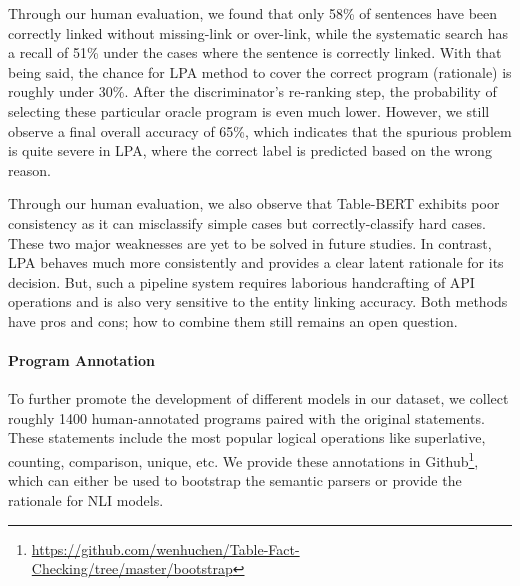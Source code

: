 \documentclass{article} \usepackage{iclr2020_conference,times}
\begin{document}
Through our human evaluation, we found that only 58\% of sentences have been correctly linked without missing-link or over-link, while the systematic search has a recall of 51\% under the cases where the sentence is correctly linked. With that being said, the chance for LPA method to cover the correct program (rationale) is roughly under 30\%. After the discriminator's re-ranking step, the probability of selecting these particular oracle program is even much lower. However, we still observe a final overall accuracy of 65\%, which indicates that the spurious problem is quite severe in LPA, where the correct label is predicted based on the wrong reason.  

Through our human evaluation, we also observe that Table-BERT exhibits poor consistency as it can misclassify simple cases but correctly-classify hard cases. These two major weaknesses are yet to be solved in future studies. In contrast, LPA behaves much more consistently and provides a clear latent rationale for its decision. But, such a pipeline system requires laborious handcrafting of API operations and is also very sensitive to the entity linking accuracy. Both methods have pros and cons; how to combine them still remains an open question.

\paragraph{Program Annotation}
To further promote the development of different models in our dataset, we collect roughly 1400 human-annotated programs paired with the original statements. These statements include the most popular logical operations like superlative, counting, comparison, unique, etc. We provide these annotations in Github\footnote{\url{https://github.com/wenhuchen/Table-Fact-Checking/tree/master/bootstrap}}, which can either be used to bootstrap the semantic parsers or provide the rationale for  NLI models.  
\end{document}
